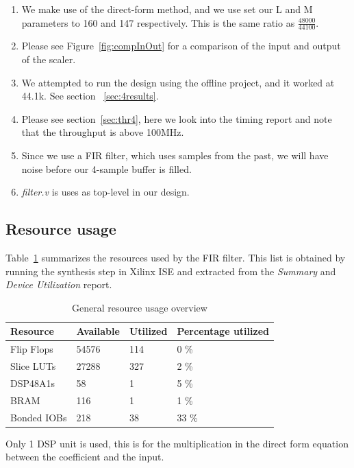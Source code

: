 \documentclass[a4paper,twoside,11pt, fleqn]{article}
\begin{document}
\begin{enumerate}
	\item We make use of the direct-form method, and we use set our L and M parameters to 160 and 147 respectively. This is the same ratio as $\frac{48000}{44100}$.
	\item Please see Figure~\ref{fig:compInOut} for a comparison of the input and output of the scaler.
	\item We attempted to run the design using the offline project, and it worked at 44.1k. See section ~\ref{sec:4results}.
	\item Please see section~\ref{sec:thr4}, here we look into the timing report and note that the throughput is above 100MHz.
	\item Since we use a FIR filter, which uses samples from the past, we will have noise before our 4-sample buffer is filled.
	\item \textit{filter.v} is uses as top-level in our design.
\end{enumerate}

\subsection{Resource usage}
\label{sec:resc4}
Table~\ref{tab:4usage} summarizes the resources used by the FIR filter. This list is obtained by running the synthesis step in Xilinx ISE and extracted from the \textit{Summary} and \textit{Device Utilization} report.

\begin{table}[h]
\begin{tabular}{|l|l|l|l|}
\hline
\textbf{Resource} & \textbf{Available} & \textbf{Utilized} & \textbf{Percentage utilized}\\
\hline
Flip Flops	& 54576 & 114 	& 0 \%\\
Slice LUTs 	& 27288 & 327 	& 2 \%\\
DSP48A1s	& 58 	& 1 	& 5 \%\\
BRAM		& 116 	& 1 	& 1 \%\\
Bonded IOBs	& 218 	& 38 	& 33 \%\\
\hline
\end{tabular}
\caption{General resource usage overview}
\label{tab:4usage}
\end{table}

Only 1 DSP unit is used, this is for the multiplication in the direct form equation between the coefficient and the input.\\
\end{document}
